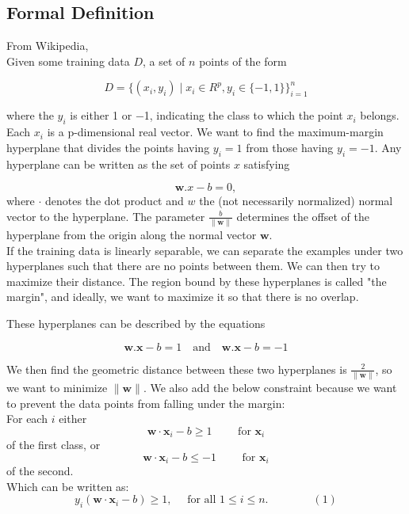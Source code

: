 \documentclass[journal]{IEEEtran}
\begin{document}
\subsection{Formal Definition}

From Wikipedia,\\ 
Given some training data $D$, a set of $n$ points of the form 

$$
D =   \lbrace \left(x_{i}, y_{i}\right) \mid x_{i} \in R^{p}, y_{i} \in \lbrace-1, 1\rbrace\rbrace_{i=1}^n     
$$
    
where the $y_i$ is either 1 or −1, indicating the class to which the point $x_i$ belongs. Each $x_i$ is a p-dimensional real vector. We want to find the maximum-margin hyperplane that divides the points having $y_i=1$ from those having $y_i=-1$. Any hyperplane can be written as the set of points $x$ satisfying 

$$
\mathbf{w}.x - b = 0,
$$
where $\cdot$ denotes the dot product and $w$ the (not necessarily normalized) normal vector to the hyperplane. The parameter $\tfrac{b}{\|\mathbf{w}\|}$ determines the offset of the hyperplane from the origin along the normal vector ${\mathbf{w}}$.\\

If the training data is linearly separable, we can separate the examples under two hyperplanes such that there are no points between them. We can then try to maximize their distance. The region bound by these hyperplanes is called "the margin", and ideally, we want to maximize it so that there is no overlap.

These hyperplanes can be described by the equations


$$
    \mathbf{w}.\mathbf{x} - b = 1    \quad \textrm{and} \quad 
    \mathbf{w}.\mathbf{x} - b = -1
$$

We then find the geometric distance between these two hyperplanes is $\tfrac{2}{\|\mathbf{w}\|}$, so we want to minimize $\|\mathbf{w}\|$. We also add the below constraint because we want to prevent the data points from falling under the margin:\\ 

For each $i$ either
$$\mathbf{w}\cdot\mathbf{x}_i - b \ge 1\qquad\text{ for }\mathbf{x}_i$$ 
of the first class, or
$$\mathbf{w}\cdot\mathbf{x}_i - b \le -1\qquad\text{ for }\mathbf{x}_i$$ 
of the second.  \\  

Which can be written as:
$$
    y_i(\mathbf{w}\cdot\mathbf{x}_i - b) \ge 1, \quad \text{ for all } 1 \le i \le n.\qquad\qquad(1)
$$
\end{document}
